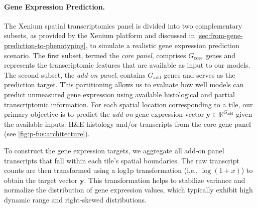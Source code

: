 


\paragraph{Gene Expression Prediction.}
The Xenium spatial transcriptomics panel is divided into two complementary subsets, as provided by the Xenium 
platform and discussed in \autoref{sec:from-gene-prediction-to-phenotyping}, to simulate a realistic gene 
expression prediction scenario. The first subset, termed the \emph{core panel}, comprises $G_{\text{core}}$ genes and represents the transcriptomic features that are available as input to our models. The second subset, the \emph{add-on panel}, contains $G_{\text{add}}$ genes and serves as the prediction target. This partitioning allows us to evaluate how well models can predict unmeasured gene expression using available histological and partial transcriptomic information. For each spatial location corresponding to a tile, our primary objective is to predict the \emph{add-on} gene expression vector $\mathbf{y}\in\mathbb{R}^{G_{\text{add}}}$ given the available inputs: H\&E histology and/or transcripts from the core gene panel (see \autoref{fig:p-fus:architecture}).

To construct the gene expression targets, we aggregate all add-on panel transcripts that fall within each tile's spatial boundaries. The raw transcript counts are then transformed using a log1p transformation (i.e., $\log(1 + x)$) to obtain the target vector $\mathbf{y}$. This transformation helps to stabilize variance and normalize the distribution of gene expression values, which typically exhibit high dynamic range and right-skewed distributions.

